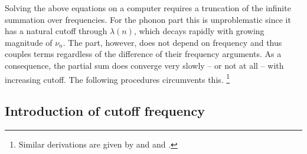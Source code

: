 Solving the above equations on a computer requires a truncation of the infinite
summation over  frequencies. For the phonon part this is
unproblematic since it has a natural cutoff through $\lambda(n)$, which decays
rapidly with growing magnitude of $\nu_n$. The  part, however,
does not depend on frequency and thus couples terms regardless of the difference
of their frequency arguments. As a consequence, the partial sum does converge
very slowly -- or not at all -- with increasing cutoff. The following procedures
circumvents this.%
%
\footnote{Similar derivations are given by 
\cite[185-188]{Schrieffer83} and  and 
\cite[Section~9]{AllenMitrovic82}.}

\subsection{Introduction of cutoff frequency}
\label{introduction of cutoff frequency}

